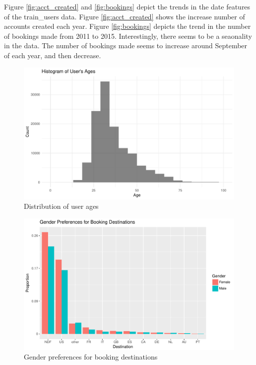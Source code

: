 \documentclass{article}
\begin{document}
Figure \ref{fig:acct_created} and \ref{fig:bookings} depict the trends in the date features of
the train\_users data. Figure \ref{fig:acct_created} shows the increase number of accounts created each year.
Figure \ref{fig:bookings} depicts the trend in the number of bookings made from 2011 to 2015. 
Interestingly, there seems to be a seaonality in the data. The number of bookings made seems to 
increase around September of each year, and then decrease. 

\begin{figure}[!htbp]
  \includegraphics[scale=0.6]{ages_histogram.pdf}
  \caption{Distribution of user ages}
  \label{fig:ages}
\end{figure}

\begin{figure}[!htbp]
  \includegraphics[scale=0.6]{gender_visual.pdf}
  \caption{Gender preferences for booking destinations}
  \label{fig:gender}
\end{figure}
\end{document}
